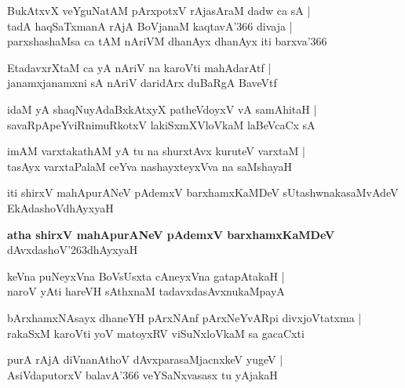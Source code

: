 \begin{shloka}
BukAtxvX veYguNatAM pArxpotxV rAjasAraM dadw ca sA |\\
tadA haqSaTxmanA rAjA BoVjanaM kaqtavA\char'366 divaja |\\
parxshashaMsa ca tAM nAriVM dhanAyx dhanAyx iti barxva\char'366
\end{shloka}

\begin{shloka}
EtadavxrXtaM ca yA nAriV na karoVti mahAdarAtf |\\
janamxjanamxni sA nAriV daridArx duBaRgA BaveVtf
\end{shloka}

\begin{shloka}
idaM yA shaqNuyAdaBxkAtxyX patheVdoyxV vA samAhitaH |\\
savaRpApeYviRnimuRkotxV lakiSxmXVloVkaM laBeVcaCx sA 
\end{shloka}

\begin{shloka}
imAM varxtakathAM yA tu na shurxtAvx kuruteV varxtaM |\\
tasAyx varxtaPalaM ceYva nashayxteyxVva na saMshayaH
\end{shloka}
iti shirxV mahApurANeV pAdemxV barxhamxKaMDeV sUtashwnakasaMvAdeV EkAdashoVdhAyxyaH

\begin{center}
\textbf{\large atha shirxV mahApurANeV pAdemxV barxhamxKaMDeV}\\
dAvxdashoV\char'263dhAyxyaH
\end{center}

\setcounter{shloka}{0}
\begin{shloka}
keVna puNeyxVna BoVsUsxta cAneyxVna gatapAtakaH |\\
naroV yAti hareVH sAthxnaM tadavxdasAvxnukaMpayA
\end{shloka}

\begin{shloka}
bArxhamxNAsayx dhaneYH pArxNAnf pArxNeYvARpi divxjoVtatxma |\\
rakaSxM karoVti yoV matoyxRV viSuNxloVkaM sa gacaCxti
\end{shloka}

\begin{shloka}
purA rAjA diVnanAthoV dAvxparasaMjacnxkeV yugeV |\\
AsiVdaputorxV balavA\char'366 veYSaNxvasasx tu yAjakaH
\end{shloka}

